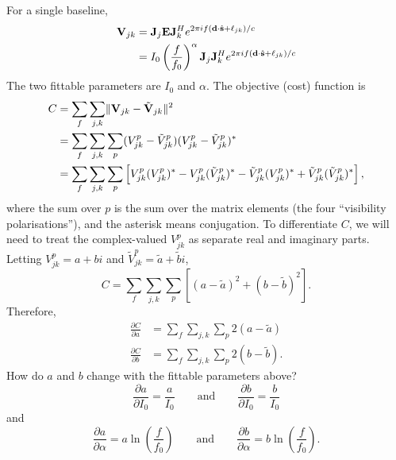 \documentclass{book}
\newcommand{\pd}[2]{\frac{\partial {#1}}{\partial {#2}}}
\newcommand{\shat}{\hat{\bf s}}
\begin{document}
For a single baseline,
\begin{equation}
    \begin{aligned}
        {\bf V}_{jk}
            &= {\bf J}_j{\bf E}{\bf J}_k^H e^{2\pi i f ({\bf d}\cdot\shat + \ell_{jk})/c} \\
            &= I_0 \left(\frac{f}{f_0}\right)^\alpha {\bf J}_j{\bf J}_k^H e^{2\pi i f ({\bf d}\cdot\shat + \ell_{jk})/c}
    \end{aligned}
\end{equation}
The two fittable parameters are $I_0$ and $\alpha$.
The objective (cost) function is
\begin{equation}
    \begin{aligned}
        C &= \sum_f \sum_{j,k} \lVert {\bf V}_{jk} - \tilde{\bf V}_{jk} \rVert^2 \\
          &= \sum_f \sum_{j,k} \sum_p (V_{jk}^p - \tilde{V}_{jk}^p)(V_{jk}^p - \tilde{V}_{jk}^p)^\ast \\
          &= \sum_f \sum_{j,k} \sum_p \left[
                V_{jk}^p (V_{jk}^p)^\ast -
                V_{jk}^p (\tilde{V}_{jk}^p)^\ast -
                \tilde{V}_{jk}^p (V_{jk}^p)^\ast +
                \tilde{V}_{jk}^p (\tilde{V}_{jk}^p)^\ast
             \right],
    \end{aligned}
\end{equation}
where the sum over $p$ is the sum over the matrix elements (the four ``visibility polarisations''), and the asterisk means conjugation.
To differentiate $C$, we will need to treat the complex-valued $V_{jk}^p$ as separate real and imaginary parts.
Letting $V_{jk}^p = a + bi$ and $\tilde{V}_{jk}^p = \tilde{a} + \tilde{b}i$,
\begin{equation}
    C = \sum_f \sum_{j,k} \sum_p \left[ (a - \tilde{a})^2 + (b - \tilde{b})^2 \right].
\end{equation}
Therefore,
\begin{equation}
    \begin{aligned}
        \pd{C}{a} &= \sum_f \sum_{j,k} \sum_p 2(a - \tilde{a}) \\
        \pd{C}{b} &= \sum_f \sum_{j,k} \sum_p 2(b - \tilde{b}).
    \end{aligned}
\end{equation}
How do $a$ and $b$ change with the fittable parameters above?
\begin{equation}
    \pd{a}{I_0} = \frac{a}{I_0}
    \qquad\text{and}\qquad
    \pd{b}{I_0} = \frac{b}{I_0}
\end{equation}
and
\begin{equation}
    \pd{a}{\alpha} = a \ln\left(\frac{f}{f_0}\right)
    \qquad\text{and}\qquad
    \pd{b}{\alpha} = b \ln\left(\frac{f}{f_0}\right).
\end{equation}
\end{document}
